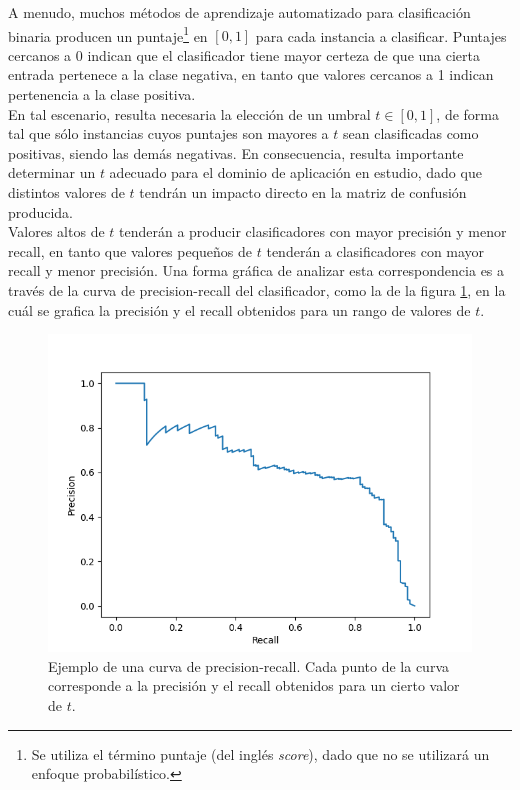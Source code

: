 A menudo, muchos métodos de aprendizaje automatizado para clasificación binaria producen un puntaje\footnote{Se utiliza el término puntaje (del inglés \textit{score}), dado que no se utilizará un enfoque probabilístico.} en $[0,1]$ para cada instancia a clasificar. Puntajes cercanos a 0 indican que el clasificador tiene mayor certeza de que una cierta entrada pertenece a la clase negativa, en tanto que valores cercanos a 1 indican pertenencia a la clase positiva. \\

En tal escenario, resulta necesaria la elección de un umbral $t \in [0,1]$, de forma tal que sólo instancias cuyos puntajes son mayores a $t$ sean clasificadas como positivas, siendo las demás negativas. En consecuencia, resulta importante determinar un $t$ adecuado para el dominio de aplicación en estudio, dado que distintos valores de $t$ tendrán un impacto directo en la matriz de confusión producida. \\

Valores altos de $t$ tenderán a producir clasificadores con mayor precisión y menor recall, en tanto que valores pequeños de $t$ tenderán a clasificadores con mayor recall y menor precisión. Una forma gráfica de analizar esta correspondencia es a través de la curva de precision-recall del clasificador, como la de la figura \ref{fig:prc}, en la cuál se grafica la precisión y el recall obtenidos para un rango de valores de $t$. \\

\begin{figure}[h]
\begin{center}
\includegraphics[width=.6\textwidth]{Kap1/PRc.png}
\end{center}
\caption[short]{Ejemplo de una curva de precision-recall. Cada punto de la curva corresponde a la precisión y el recall obtenidos para un cierto valor de $t$. }
\label{fig:prc}
\end{figure}

